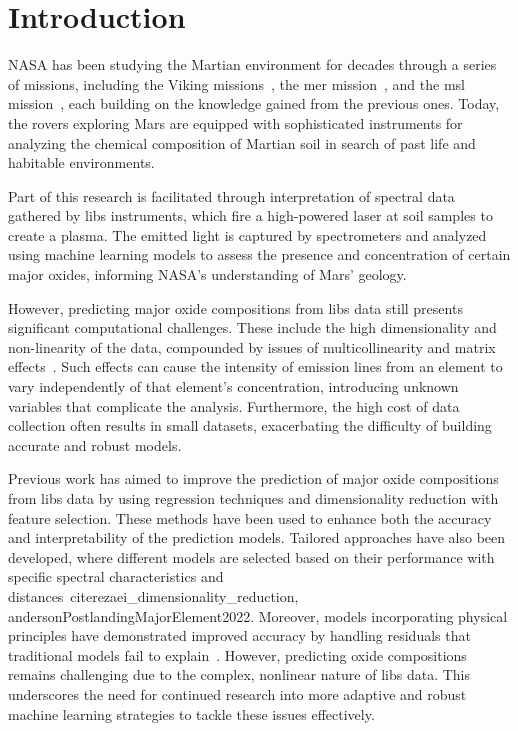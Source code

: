 \section{Introduction}\label{sec:introduction}
NASA has been studying the Martian environment for decades through a series of missions, including the Viking missions~\cite{marsnasagov_vikings}, the \gls{mer} mission~\cite{marsnasagov_observer, marsnasagov_spirit_opportunity}, and the \gls{msl} mission~\cite{marsnasagov_msl}, each building on the knowledge gained from the previous ones.
Today, the rovers exploring Mars are equipped with sophisticated instruments for analyzing the chemical composition of Martian soil in search of past life and habitable environments.

Part of this research is facilitated through interpretation of spectral data gathered by \gls{libs} instruments, which fire a high-powered laser at soil samples to create a plasma.
The emitted light is captured by spectrometers and analyzed using machine learning models to assess the presence and concentration of certain major oxides, informing NASA's understanding of Mars' geology.

However, predicting major oxide compositions from \gls{libs} data still presents significant computational challenges.
These include the high dimensionality and non-linearity of the data, compounded by issues of multicollinearity and matrix effects~\cite{andersonImprovedAccuracyQuantitative2017}.
Such effects can cause the intensity of emission lines from an element to vary independently of that element's concentration, introducing unknown variables that complicate the analysis.
Furthermore, the high cost of data collection often results in small datasets, exacerbating the difficulty of building accurate and robust models.

Previous work has aimed to improve the prediction of major oxide compositions from \gls{libs} data by using regression techniques and dimensionality reduction with feature selection.
These methods have been used to enhance both the accuracy and interpretability of the prediction models.
Tailored approaches have also been developed, where different models are selected based on their performance with specific spectral characteristics and distances~cite{rezaei_dimensionality_reduction, andersonPostlandingMajorElement2022}.
Moreover, models incorporating physical principles have demonstrated improved accuracy by handling residuals that traditional models fail to explain~\cite{song_DF-K-ELM}.
However, predicting oxide compositions remains challenging due to the complex, nonlinear nature of \gls{libs} data.
This underscores the need for continued research into more adaptive and robust machine learning strategies to tackle these issues effectively.

